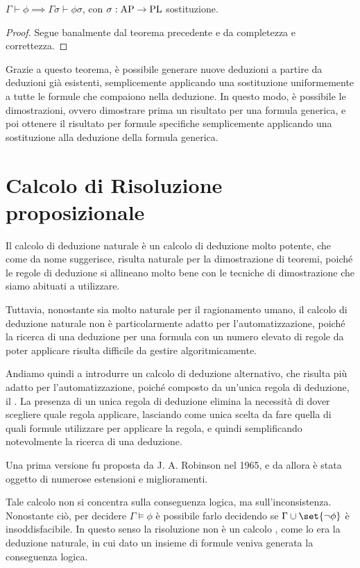 \begin{corollary}{}
  \(\Gamma\vdash\phi\implies\Gamma\sigma\vdash\phi\sigma\), con \(\sigma:\AP \to \PL\) sostituzione.
\end{corollary}
\begin{proof}
  Segue banalmente dal teorema precedente e da completezza e correttezza.
\end{proof}

Grazie a questo teorema, è possibile generare nuove deduzioni a partire da deduzioni già esistenti, semplicemente applicando una sostituzione uniformemente a tutte le formule che compaiono nella deduzione. In questo modo, è possibile  le dimostrazioni, ovvero dimostrare prima un risultato per una formula generica, e poi ottenere il risultato per formule specifiche semplicemente applicando una sostituzione alla deduzione della formula generica.

\section{Calcolo di Risoluzione proposizionale}

Il calcolo di deduzione naturale è un calcolo di deduzione molto potente, che come da nome suggerisce, risulta naturale per la dimostrazione di teoremi, poiché le regole di deduzione si allineano molto bene con le tecniche di dimostrazione che siamo abituati a utilizzare.

Tuttavia, nonostante sia molto naturale per il ragionamento umano, il calcolo di deduzione naturale non è particolarmente adatto per l'automatizzazione, poiché la ricerca di una deduzione per una formula con un numero elevato di regole da poter applicare risulta difficile da gestire algoritmicamente.

Andiamo quindi a introdurre un calcolo di deduzione alternativo, che risulta più adatto per l'automatizzazione, poiché composto da un'unica regola di deduzione, il . La presenza di un unica regola di deduzione elimina la necessità di dover scegliere quale regola applicare, lasciando come unica scelta da fare quella di quali formule utilizzare per applicare la regola, e quindi semplificando notevolmente la ricerca di una deduzione.

Una prima versione fu proposta da J. A. Robinson nel 1965, e da allora è stata oggetto di numerose estensioni e miglioramenti.

Tale calcolo non si concentra sulla conseguenza logica, ma sull'inconsistenza. 
Nonostante ciò, per decidere \(\Gamma\models\phi\) è possibile farlo decidendo se \(\Gamma\cup\set{\neg\phi}\) è insoddisfacibile.
In questo senso la risoluzione non è un calcolo , come lo era la deduzione naturale, in cui dato un insieme di formule veniva generata la conseguenza logica.

